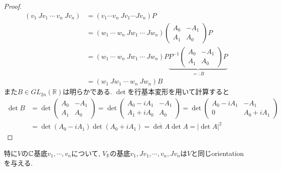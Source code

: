 \begin{proof}
\begin{align*}
(v_{1}\ Jv_{1}\ \cdots\ v_{n}\ Jv_{n})
&=(v_{1}\cdots v_{n}\ Jv_{1}\cdots Jv_{n})P
\\
&=(w_{1}\ \cdots\ w_{n}\ Jw_{1}\ \cdots\ Jw_{n})
\begin{pmatrix}
A_{0} & -A_{1}\\
A_{1} & A_{0}
\end{pmatrix}
P
\\
&=(w_{1}\ \cdots\ w_{n}\ Jw_{1}\ \cdots\ Jw_{n})P
\underbrace{
P^{-1}
\begin{pmatrix}
A_{0} & -A_{1}\\
A_{1} & A_{0}
\end{pmatrix}
P
}_{=:B}
\\
&=(w_{1}\ Jw_{1}\ \cdots\ w_{n}\ Jw_{n})B
\end{align*}
また$B\in GL_{2n}(\mathbb{R})$は明らかである. 
$\det$を行基本変形を用いて計算すると
\begin{align*}
\det B&=\det
\begin{pmatrix}
A_{0} & -A_{1}\\
A_{1} & A_{0}
\end{pmatrix}
=\det
\begin{pmatrix}
A_{0}-iA_{1} & -A_{1}\\
A_{1}+iA_{0} & A_{0}
\end{pmatrix}
=\det
\begin{pmatrix}
A_{0}-iA_{1} & -A_{1}\\
0 & A_{0}+iA_{1}
\end{pmatrix}
\\
&=\det(A_{0}-iA_{1})\det(A_{0}+iA_{1})
=\overline{\det A}\det A=|\det A|^{2}
\end{align*}
\end{proof}
特に$V$の$\mathbb{C}$基底$v_{1},\cdots,v_{n}$について, 
$V_{\mathbb{R}}$の基底$v_{1},Jv_{1},\cdots,v_{n},Jv_{n}$は$V$と同じorientationを与える. 




